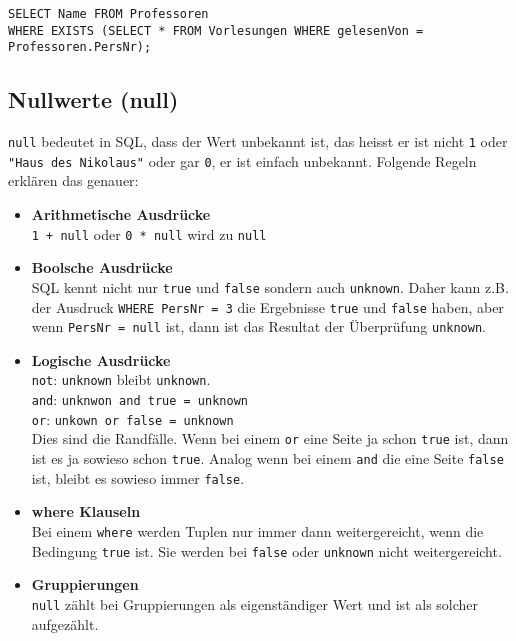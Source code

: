 \begin{lstlisting}[caption={SQL Beispiel mit Exists},label=lst:bsp_exists]
SELECT Name FROM Professoren
WHERE EXISTS (SELECT * FROM Vorlesungen WHERE gelesenVon = Professoren.PersNr);
\end{lstlisting}

\subsection{Nullwerte (null)}

\texttt{null} bedeutet in SQL, dass der Wert unbekannt ist, das heisst er ist nicht \texttt{1} oder \texttt{"Haus des Nikolaus"} oder gar \texttt{0}, er ist einfach unbekannt. Folgende Regeln erklären das genauer:

\begin{itemize}
  \item \textbf{Arithmetische Ausdrücke} \\
  \texttt{1 + null} oder \texttt{0 * null} wird zu \texttt{null}
  \item \textbf{Boolsche Ausdrücke} \\
  SQL kennt nicht nur \texttt{true} und \texttt{false} sondern auch \texttt{unknown}. Daher kann z.B. der Ausdruck \texttt{WHERE PersNr = 3} die Ergebnisse \texttt{true} und \texttt{false} haben, aber wenn \texttt{PersNr = null} ist, dann ist das Resultat der Überprüfung \texttt{unknown}.
  \item \textbf{Logische Ausdrücke} \\
  \texttt{not}: \texttt{unknown} bleibt \texttt{unknown}. \\
  \texttt{and}: \texttt{unknwon and true = unknown} \\
  \texttt{or}: \texttt{unkown or false = unknown} \\
  Dies sind die Randfälle. Wenn bei einem \texttt{or} eine Seite ja schon \texttt{true} ist, dann ist es ja sowieso schon \texttt{true}. Analog wenn bei einem \texttt{and} die eine Seite \texttt{false} ist, bleibt es sowieso immer \texttt{false}.
  \item \textbf{where Klauseln} \\
  Bei einem \texttt{where} werden Tuplen nur immer dann weitergereicht, wenn die Bedingung \texttt{true} ist. Sie werden bei \texttt{false} oder \texttt{unknown} nicht weitergereicht.
  \item \textbf{Gruppierungen} \\
  \texttt{null} zählt bei Gruppierungen als eigenständiger Wert und ist als solcher aufgezählt.
\end{itemize}

